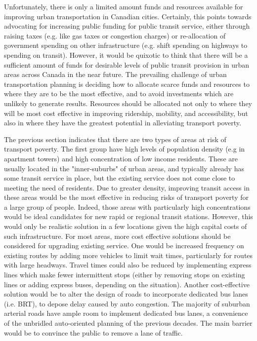 \documentclass[11 pt, letterpaper]{article}
\begin{document}
{Unfortunately, there is only a limited amount funds and resources available for improving urban transportation in Canadian cities. Certainly, this points towards advocating for increasing public funding for public transit service, either through raising taxes (e.g. like gas taxes or congestion charges) or re-allocation of government spending on other infrastructure (e.g. shift spending on highways to spending on transit). However, it would be quixotic to think that there will be a sufficient amount of funds for desirable levels of public transit provision in urban areas across Canada in the near future. The prevailing challenge of urban transportation planning is deciding how to allocate scarce funds and resources to where they are to be the most effective, and to avoid investments which are unlikely to generate results. Resources should be allocated not only to where they will be most cost effective in improving ridership, mobility, and accessibility, but also in where they have the greatest potential in alleviating transport poverty.

The previous section indicates that there are two types of areas at risk of transport poverty. The first group have high levels of population density (e.g in apartment towers) and high concentration of low income residents. These are usually located in the "inner-suburbs" of urban areas, and typically already has some transit service in place, but the existing service does not come close to meeting the need of residents. Due to greater density, improving transit access in these areas would be the most effective in reducing risks of transport poverty for a large group of people. Indeed, those areas with particularly high concentrations would be ideal candidates for new rapid or regional transit stations. However, this would only be realistic solution in a few locations given the high capital costs of such infrastructure. For most areas, more cost effective solutions should be considered for upgrading existing service. One would be increased frequency on existing routes by adding more vehicles to limit wait times, particularly for routes with large headways. Travel times could also be reduced by implementing express lines which make fewer intermittent stops (either by removing stops on existing lines or adding express buses, depending on the situation). Another cost-effective solution would be to alter the design of roads to incorporate dedicated bus lanes (i.e. BRT), to depose delay caused by auto congestion. The majority of suburban arterial roads have ample room to implement dedicated bus lanes, a convenience of the unbridled auto-oriented planning of the previous decades. The main barrier would be to convince the public to remove a lane of traffic.

}
\end{document}
